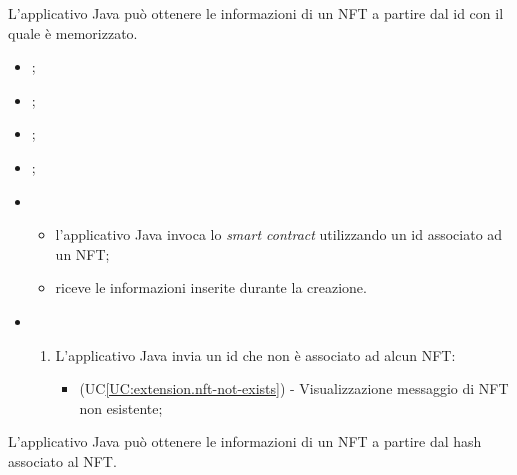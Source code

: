 L'applicativo Java può ottenere le informazioni di un NFT a partire dal id con il quale è memorizzato.

\begin{itemize}
  \item {};
  \item {};
  \item {};
  \item {};
  \item \UCMain
  \begin{itemize}
    \item l'applicativo Java invoca lo \textit{smart contract} utilizzando un id associato ad un NFT;
    \item riceve le informazioni inserite durante la creazione.
  \end{itemize}

  \item \UCExt
  \begin{enumerate}[label=\lett]
    \item L'applicativo Java invia un id che non è associato ad alcun NFT:
    \begin{itemize}
      \item (UC\ref{UC:extension.nft-not-exists}) - Visualizzazione messaggio di NFT non esistente;
    \end{itemize}
  \end{enumerate}
\end{itemize}

L'applicativo Java può ottenere le informazioni di un NFT a partire dal hash associato al NFT.

